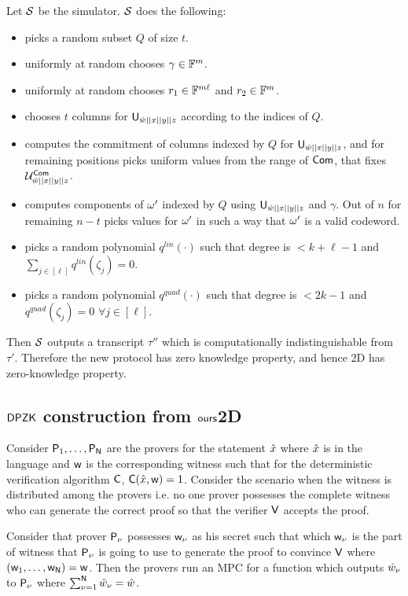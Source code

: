 Let $\mathcal{S}$ be the simulator. $\mathcal{S}$ does the following:
\begin{itemize}
	\item  picks a random subset $Q$ of size $t$.
	\item  uniformly at random chooses $\gamma \in \mathbb{F}^m$.
	\item  uniformly at random chooses $r_1 \in \mathbb{F}^{m\ell}$ and $r_2 \in \mathbb{F}^m$.
	\item  chooses $t$ columns for $\mathsf{U}_{\hat{w}||x||y||z}$ according to the indices of $Q$.
	\item  computes the commitment of columns indexed by $Q$ for $\mathsf{U}_{\hat{w}||x||y||z}$, and for remaining positions picks uniform values from the range of $\mathsf{Com}$, that fixes $\mathcal{U}^{\mathsf{Com}}_{\hat{w}||x||y||z}$.
	\item  computes components of $\omega'$ indexed by $Q$ using $\mathsf{U}_{\hat{w}||x||y||z}$ and $\gamma$. Out of $n$ for remaining $n-t$ picks values for $\omega'$ in such a way that $\omega'$ is a valid codeword.
	\item  picks a random polynomial $q^{lin}(\cdot)$ such that degree is $<k+\ell-1$ and $\sum_{j\in [\ell]} q^{lin}(\zeta_j) = 0$.
	\item  picks a random polynomial $q^{quad}(\cdot)$ such that degree is $<2k-1$ and $q^{quad}(\zeta_j) = 0$ $\forall j\in [\ell]$.
\end{itemize} 
Then $\mathcal{S}$ outputs a transcript $\tau''$ which is computationally indistinguishable from $\tau'$. Therefore the new protocol has zero knowledge property, and hence \name2D has zero-knowledge property.

\subsection{$\mathsf{DPZK}$ construction from $\textsf{ours}$2D}

Consider $\mathsf{P}_1, \ldots, \mathsf{P}_{\mathsf{N}}$ are the provers for the statement $\hat{x}$ where $\hat{x}$ is in the language and $\mathsf{w}$ is the corresponding witness such that for the deterministic verification algorithm $\mathsf{C}$, $\mathsf{C}(\hat{x}, \mathsf{w})=1$. Consider the scenario when the witness is distributed among the provers i.e. no one prover possesses the complete witness who can generate the correct proof so that the verifier $\mathsf{V}$ accepts the proof.

Consider that prover $\mathsf{P}_{\nu}$ possesses $\mathsf{w}_{\nu}$ as his secret such that which $\mathsf{w}_{\nu}$ is the part of witness that $\mathsf{P}_{\nu}$ is going to use to generate the proof to convince $\mathsf{V}$ where $(\mathsf{w}_1,\ldots, \mathsf{w}_{\mathsf{N}})=\mathsf{w}$. Then the provers run an MPC for a function which outputs $\hat{w}_{\nu}$ to $\mathsf{P}_{\nu}$ where $\sum_{\nu=1}^{\mathsf{N}}\hat{w}_{\nu} = \hat{w}$.

